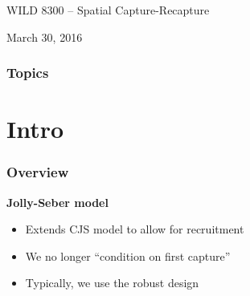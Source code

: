 \documentclass[color=usenames,dvipsnames]{beamer}
\begin{document}
\begin{frame}[plain]
  \begin{center}
    \LARGE {\bf \color{RoyalBlue}{Spatial Jolly-Seber Model}} \par
    \vspace{0.8cm}
    \large WILD 8300 -- Spatial Capture-Recapture \par
    \vspace{0.2cm}
    March 30, 2016
  \end{center}
\end{frame}







\begin{frame}[plain]
  \frametitle{Topics}
  \Large
\end{frame}




\section{Intro}









\begin{frame}
  \frametitle{Overview}
  \large
  {\bf Jolly-Seber model}
  \begin{itemize}
    \item Extends CJS model to allow for recruitment
    \item We no longer ``condition on first capture''
    \item Typically, we use the robust design
  \end{itemize}
\end{frame}
\end{document}
